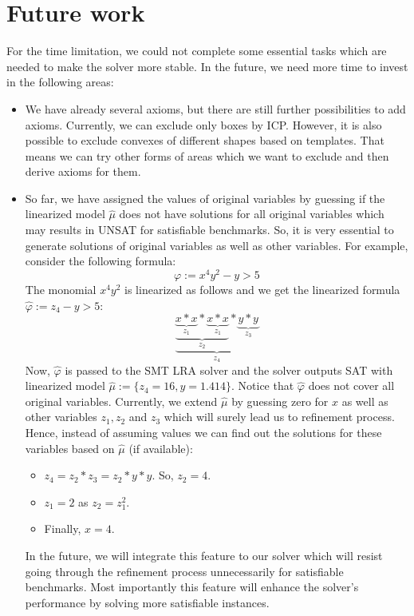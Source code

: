 \section{Future work}
\label{sec:Future_Work}
For the time limitation, we could not complete some essential tasks which are needed to make the solver more stable.  
In the future, we need more time to invest in the following areas:
\begin{itemize}
    \item We have already several axioms, but there are still further possibilities to add axioms.
    Currently, we can exclude only boxes by ICP.
    However, it is also possible to exclude convexes of different shapes based on templates.
    That means we can try other forms of areas which we want to exclude and then derive axioms for them.
    \item So far, we have assigned the values of original variables by guessing if the linearized model $\hat{\mu}$ does not have solutions for all original variables which may results in UNSAT for satisfiable benchmarks.
    So, it is very essential to generate solutions of original variables as well as other variables.
    For example, consider the following formula:
    $$\varphi := x^4y^2 - y > 5$$
   The monomial $x^4y^2$ is linearized as follows and we get the linearized formula $\hat{\varphi} := z_4 -y > 5$:
    $$\underbrace{ \underbrace{ \underbrace{ x \ast x }\limits_{z_{1}} \ast \underbrace{ x \ast x }\limits_{z_{1}}}\limits_{z_{2}} \ast \underbrace{ y \ast y }\limits_{z_{3}}}\limits_{z_{4}}$$
    Now, $\hat{\varphi}$ is passed to the SMT LRA solver and the solver outputs SAT with linearized model $\hat{\mu} := \{z_4 = 16, y = 1.414\}$.
    Notice that $\hat{\varphi}$ does not cover all original variables. 
    Currently, we extend $\hat{\mu}$ by guessing zero for $x$ as well as other variables $z_1, z_2$ and $z_3$ which will surely lead us to refinement process.
    Hence, instead of assuming values we can find out the solutions for these variables based on $\hat{\mu}$ (if available):
    \begin{itemize} 
        \item  $z_4 = z_2 \ast z_3 = z_2 \ast y \ast y$.
        So, $z_2 = 4$.
        \item $z_1 = 2$ as $z_2 = z_1^2$.
        \item Finally, $x = 4$.
     \end{itemize}
     In the future, we will integrate this feature to our solver which will resist going through the refinement process unnecessarily for satisfiable benchmarks.
     Most importantly this feature will enhance the solver's performance by solving more satisfiable instances.
\end{itemize}

